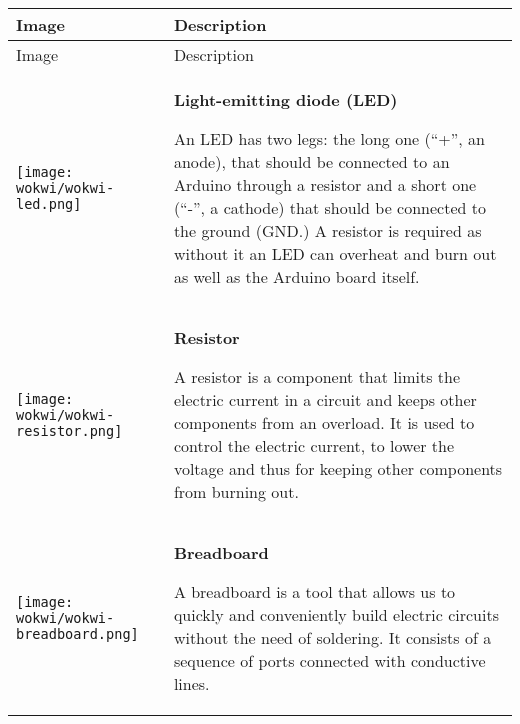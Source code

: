 \documentclass[../sparc.tex]{subfiles}
\begin{document}
\begin{longtable}{|>{
      \centering\arraybackslash
    }p{3cm}|>{
      \centering\arraybackslash}p{8cm}|
  }
  \hline
  Image & Description \\ \hline
  \endfirsthead

  \hline
  Image & Description \\ \hline
  \endhead

  \hline
  \parbox[t][1.4cm][c]{2cm}{\centering \vspace{1cm}
    \texttt{[image: wokwi/wokwi-led.png]}} &
  \parbox[t][3cm][t]{8cm}{
    \centering \textbf{Light-emitting diode (LED)}\\ \raggedright

    An LED has two legs: the long one (``+'', an anode), that should be connected
    to an Arduino through a resistor and a short one (``-'', a cathode) that
    should be connected to the ground (GND.)  A resistor is required as without
    it an LED can overheat and burn out as well as the Arduino board itself.

  } \\  \hline

  \parbox[t][0,5cm][c]{2cm}{\centering \vspace{1cm}
    \texttt{[image: wokwi/wokwi-resistor.png]}} &
  \parbox[t][2.6cm][t]{8cm}{
    \centering \textbf{Resistor}\\ \raggedright

    A resistor is a component that limits the electric current in a circuit and
    keeps other components from an overload.  It is used to control the electric
    current, to lower the voltage and thus for keeping other components from
    burning out.

  } \\  \hline

  \parbox[t][2,3cm][c]{2cm}{\centering \vspace{0.8cm}
    \texttt{[image: wokwi/wokwi-breadboard.png]}} &
  \parbox[t][3.9cm][t]{8cm}{
    \centering \textbf{Breadboard}\\ \raggedright

    A breadboard is a tool that allows us to quickly and conveniently build
    electric circuits without the need of soldering.  It consists of a sequence
    of ports connected with conductive lines.

  } \\  \hline


\end{longtable}
\end{document}
